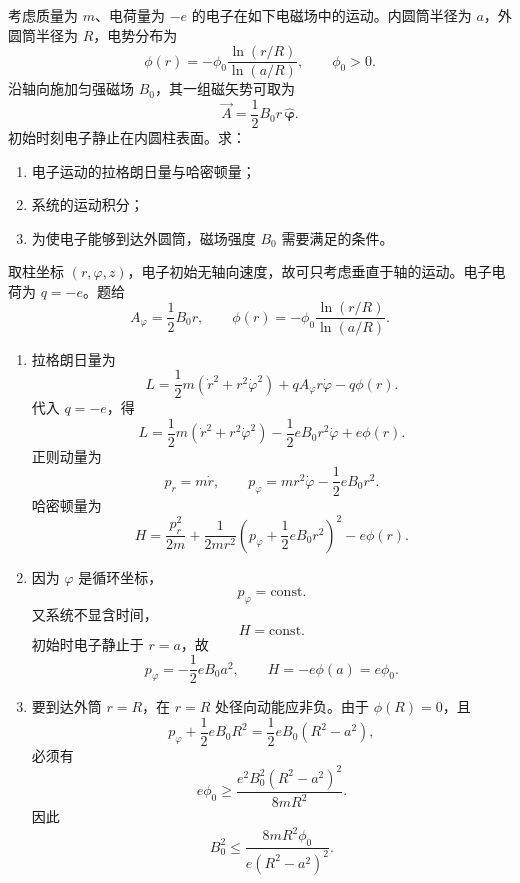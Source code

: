 \begin{question}[圆筒电磁场中的电子]
考虑质量为 $m$、电荷量为 $-e$ 的电子在如下电磁场中的运动。内圆筒半径为 $a$，外圆筒半径为 $R$，电势分布为
\[
  \phi(r)=-\phi_0\frac{\ln(r/R)}{\ln(a/R)},\qquad \phi_0>0.
\]
沿轴向施加匀强磁场 $B_0$，其一组磁矢势可取为
\[
  \vec A=\frac12B_0r\,\hat{\boldsymbol\varphi}.
\]
初始时刻电子静止在内圆柱表面。求：
\begin{enumerate}
  \item 电子运动的拉格朗日量与哈密顿量；
  \item 系统的运动积分；
  \item 为使电子能够到达外圆筒，磁场强度 $B_0$ 需要满足的条件。
\end{enumerate}

\begin{solution}
取柱坐标 $(r,\varphi,z)$，电子初始无轴向速度，故可只考虑垂直于轴的运动。电子电荷为 $q=-e$。题给
\[
  A_\varphi=\frac12B_0r,
  \qquad
  \phi(r)=-\phi_0\frac{\ln(r/R)}{\ln(a/R)}.
\]
\begin{enumerate}
  \item 拉格朗日量为
  \[
    L=\frac12m(\dot r^2+r^2\dot\varphi^2)
    +qA_\varphi r\dot\varphi-q\phi(r).
  \]
  代入 $q=-e$，得
  \[
    \boxed{L=\frac12m(\dot r^2+r^2\dot\varphi^2)
    -\frac12eB_0r^2\dot\varphi+e\phi(r)}.
  \]
  正则动量为
  \[
    p_r=m\dot r,
    \qquad
    p_\varphi=mr^2\dot\varphi-\frac12eB_0r^2.
  \]
  哈密顿量为
  \[
    \boxed{H=\frac{p_r^2}{2m}
    +\frac{1}{2mr^2}\left(p_\varphi+\frac12eB_0r^2\right)^2
    -e\phi(r)}.
  \]
  \item 因为 $\varphi$ 是循环坐标，
  \[
    \boxed{p_\varphi=\mathrm{const.}}
  \]
  又系统不显含时间，
  \[
    \boxed{H=\mathrm{const.}}
  \]
  初始时电子静止于 $r=a$，故
  \[
    p_\varphi=-\frac12eB_0a^2,
    \qquad
    H=-e\phi(a)=e\phi_0.
  \]
  \item 要到达外筒 $r=R$，在 $r=R$ 处径向动能应非负。由于 $\phi(R)=0$，且
  \[
    p_\varphi+\frac12eB_0R^2=\frac12eB_0(R^2-a^2),
  \]
  必须有
  \[
    e\phi_0\ge
    \frac{e^2B_0^2(R^2-a^2)^2}{8mR^2}.
  \]
  因此
  \[
    \boxed{B_0^2\le
    \frac{8mR^2\phi_0}{e(R^2-a^2)^2}}.
  \]
\end{enumerate}
\end{solution}
\end{question}

